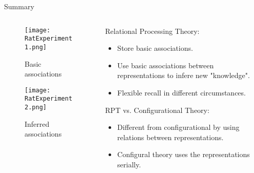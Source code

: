 \documentclass{beamer}
\begin{document}
\begin{frame}{Summary}
		\begin{columns}
			
		\begin{column}{0.3\linewidth}
		\begin{figure}[h!]
		\centering
		\texttt{[image: RatExperiment1.png]}
		\caption*{Basic associations}
		\end{figure}
		\begin{figure}[h!]
		\centering
		\texttt{[image: RatExperiment2.png]}
		\caption*{Inferred associations}
		\end{figure}
		\end{column}
		\hfill

		\begin{column}{0.6\linewidth}
	Relational Processing Theory:
  \begin{itemize}
	\item
			Store basic associations.
  \item
		  Use basic associations between representations to infere new "knowledge".
  \item
		  Flexible recall in different circumstances.
  \end{itemize}
  
  RPT vs. Configurational Theory:
  \begin{itemize}
  \item
		  Different from configurational by using relations between representations.
	\item
			Configural theory uses the representations serially.
  \end{itemize}
		\end{column}
		\end{columns}


\end{frame}
\end{document}
